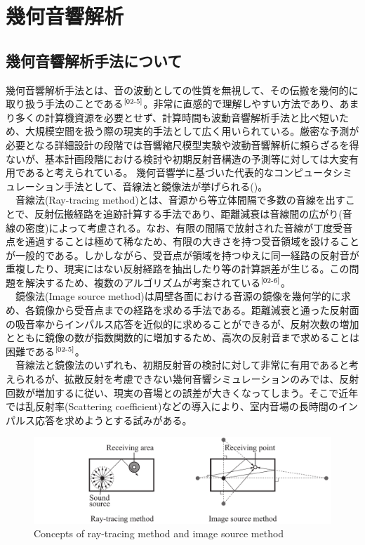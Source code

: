 \chapter{幾何音響解析}

\section{幾何音響解析手法について}
幾何音響解析手法とは、音の波動としての性質を無視して、その伝搬を幾何的に取り扱う手法のことである$^{\text{\cite{02-5}}}$。非常に直感的で理解しやすい方法であり、あまり多くの計算機資源を必要とせず、計算時間も波動音響解析手法と比べ短いため、大規模空間を扱う際の現実的手法として広く用いられている。厳密な予測が必要となる詳細設計の段階では音響縮尺模型実験や波動音響解析に頼らざるを得ないが、基本計画段階における検討や初期反射音構造の予測等に対しては大変有用であると考えられている。
幾何音響学に基づいた代表的なコンピュータシミュレーション手法として、音線法と鏡像法が挙げられる()。
\\　音線法(Ray-tracing method)とは、音源から等立体間隔で多数の音線を出すことで、反射伝搬経路を追跡計算する手法であり、距離減衰は音線間の広がり(音線の密度)によって考慮される。なお、有限の間隔で放射された音線が丁度受音点を通過することは極めて稀なため、有限の大きさを持つ受音領域を設けることが一般的である。しかしながら、受音点が領域を持つゆえに同一経路の反射音が重複したり、現実にはない反射経路を抽出したり等の計算誤差が生じる。この問題を解決するため、複数のアルゴリズムが考案されている$^{\text{\cite{02-6}}}$。
\\　鏡像法(Image source method)は周壁各面における音源の鏡像を幾何学的に求め、各鏡像から受音点までの経路を求める手法である。距離減衰と通った反射面の吸音率からインパルス応答を近似的に求めることができるが、反射次数の増加とともに鏡像の数が指数関数的に増加するため、高次の反射音まで求めることは困難である$^{\text{\cite{02-5}}}$。
\\　音線法と鏡像法のいずれも、初期反射音の検討に対して非常に有用であると考えられるが、拡散反射を考慮できない幾何音響シミュレーションのみでは、反射回数が増加するに従い、現実の音場との誤差が大きくなってしまう。そこで近年では乱反射率(Scattering coefficient)などの導入により、室内音場の長時間のインパルス応答を求めようとする試みがある。
\begin{figure}[H]
    \centering
    \includegraphics[keepaspectratio,scale=0.65]{02_att/kikaonkyo.pdf}
    \caption{\hspace{1mm}Concepts of ray-tracing method and image source method}
    \label{fig:音線法と鏡像法}
\end{figure}

